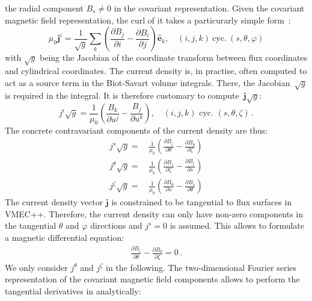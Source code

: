 the radial component $B_s \neq 0$ in the covariant representation.
%
Given the covariant magnetic field representation, the curl of it takes a particurarly simple form~\cite{dHaseleer}:
\begin{equation}
 \mu_0 \mathbf{j}^i = \frac{1}{\sqrt{g}} \sum_k \left(  \frac{\partial B_j}{\partial i}
                                             - \frac{\partial B_i}{\partial j} \right)
                                       \hat{\mathbf{e}}_k, \quad (i,j,k) ~ \mathrm{cyc.} ~ (s, \theta, \varphi)
\end{equation}
with $\sqrt{g}$ being the Jacobian of the coordinate transform between flux coordinates and cylindrical coordinates.
%
The current density is, in practise, often computed to act as a source term in the Biot-Savart volume integrals.
There, the Jacobian~$\sqrt{g}$ is required in the integral.
It is therefore customary to compute~$\mathbf{j} \sqrt{g}$:
\begin{equation}
 j^i \sqrt{g} = \frac{1}{\mu_0} \left( \frac{B_k}{\partial u^j} - \frac{B_j}{\partial u^k} \right) , \quad (i,j,k) \textrm{ cyc. } (s,\theta,\zeta) \, .
\end{equation}
%
The concrete contravariant components of the current density are thus:
\begin{align}
 j^s      \sqrt{g} =&\, \frac{1}{\mu_0} \left( \frac{\partial B_\zeta }{\partial \theta} - \frac{\partial B_\theta}{\partial \zeta } \right) \nonumber \\
 j^\theta \sqrt{g} =&\, \frac{1}{\mu_0} \left( \frac{\partial B_s     }{\partial \zeta } - \frac{\partial B_\zeta }{\partial s     } \right) \label{eqn:currx} \\
 j^\zeta  \sqrt{g} =&\, \frac{1}{\mu_0} \left( \frac{\partial B_\theta}{\partial s     } - \frac{\partial B_s     }{\partial \theta} \right) \nonumber
\end{align}
%
The current density vector $\mathbf{j}$ is constrained to be tangential to flux surfaces in VMEC++.
%
Therefore, the current density can only have non-zero components in the tangential $\theta$ and $\varphi$ directions and $j^s = 0$ is assumed.
%
This allows to formulate a magnetic differential equation:
\begin{align}
 \frac{\partial B_\zeta }{\partial \theta} - \frac{\partial B_\theta}{\partial \zeta } = 0 \, .
\end{align}
%
We only consider $j^\theta$ and $j^\zeta$ in the following.
%
The two-dimensional Fourier series representation of the covariant magnetic field components
allows to perform the tangential derivatives in  analytically:
